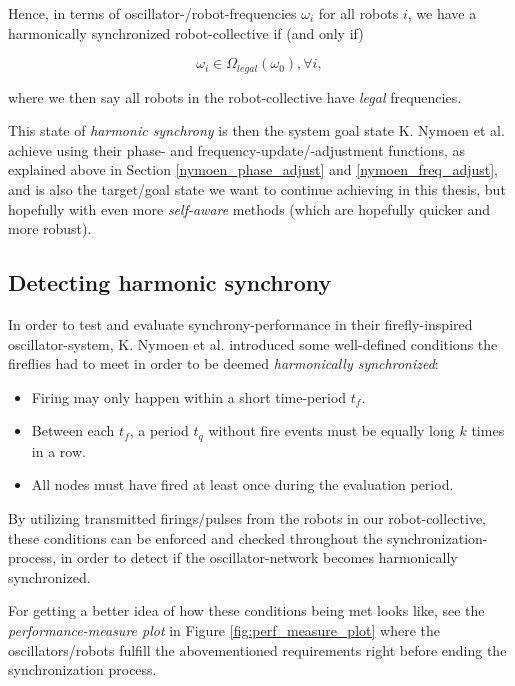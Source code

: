 Hence, in terms of oscillator-/robot-frequencies $\omega_i$ for all robots $i$, we have a harmonically synchronized robot-collective if (and only if)

\begin{equation}\label{synced_freqs}
\omega_i \in \Omega_{legal}(\omega_0) , \forall i ,
\end{equation}

where we then say all robots in the robot-collective have \textit{legal} frequencies.



This state of \textit{harmonic synchrony} is then the system goal state K. Nymoen et al. achieve using their phase- and frequency-update/-adjustment functions, as explained above in Section \ref{nymoen_phase_adjust} and \ref{nymoen_freq_adjust}, and is also the target/goal state we want to continue achieving in this thesis, but hopefully with even more \textit{self-aware} methods (which are hopefully quicker and more robust).


	\subsection{Detecting harmonic synchrony}
	\label{subsec:harmonic_synchrony}
	In order to test and evaluate synchrony-performance in their firefly-inspired oscillator-system, K. Nymoen et al. \cite{nymoen_synch} introduced some well-defined conditions the fireflies had to meet in order to be deemed \textit{harmonically synchronized}:
	\begin{itemize}
		\item Firing may only happen within a short time-period $t_f$.
		\item Between each $t_f$, a period $t_q$ without fire events must be equally long $k$ times in a row.
		\item All nodes must have fired at least once during the evaluation period.
	\end{itemize}
	
	By utilizing transmitted firings/pulses from the robots in our robot-collective, these conditions can be enforced and checked throughout the synchronization-process, in order to detect if the oscillator-network becomes harmonically synchronized.
	
	For getting a better idea of how these conditions being met looks like, see the \textit{performance-measure plot} in Figure \ref{fig:perf_measure_plot} where the oscillators/robots fulfill the abovementioned requirements right before ending the synchronization process.
	

